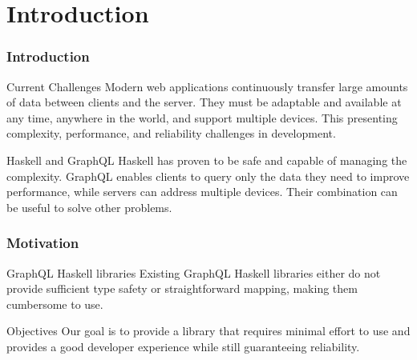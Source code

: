 \section{Introduction}

\begin{frame}\frametitle{Introduction}

    \begin{block}{Current Challenges}
        Modern web applications continuously transfer large amounts of data between clients and the server. They must be adaptable and available at any time, anywhere in the world, and support multiple devices. This presenting complexity, performance, and reliability challenges in development. 
    \end{block}

    \begin{block}{Haskell and  GraphQL}
        Haskell has proven to be safe and capable of managing the complexity. GraphQL enables clients to query only the data they need to improve performance, while servers can address multiple devices. Their combination can be useful to solve other problems.
    \end{block}

\end{frame}

\begin{frame}\frametitle{Motivation}

\begin{block}{GraphQL Haskell libraries}
    Existing GraphQL Haskell libraries either do not provide sufficient type safety or straightforward mapping, making them cumbersome to use.
\end{block}

\begin{block}{Objectives}
Our goal is to provide a library that requires minimal effort to use and provides a good developer experience while still guaranteeing reliability.
\end{block}

\end{frame}